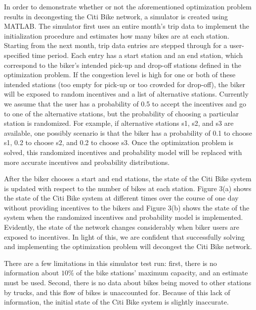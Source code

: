 \documentclass[times, 10pt,twocolumn]{article}
\begin{document}
In order to demonstrate whether or not the aforementioned optimization problem results in decongesting the Citi Bike network, a simulator is created using MATLAB. The simulator first uses an entire month's trip data to implement the initialization procedure and estimates how many bikes are at each station. Starting from the next month, trip data entries are stepped through for a user-specified time period. Each entry has a start station and an end station, which correspond to the biker's intended pick-up and drop-off stations defined in the optimization problem. If the congestion level is high for one or both of these intended stations (too empty for pick-up or too crowded for drop-off), the biker will be exposed to random incentives and a list of alternative stations. Currently we assume that the user has a probability of 0.5 to accept the incentives and go to one of the alternative stations, but the probability of choosing a particular station is randomized. For example, if alternative stations s1, s2, and s3 are available, one possibly scenario is that the biker has a probability of 0.1 to choose s1, 0.2 to choose s2, and 0.2 to choose s3. Once the optimization problem is solved, this randomized incentives and probability model will be replaced with more accurate incentives and probability distributions.

After the biker chooses a start and end stations, the state of the Citi Bike system is updated with respect to the number of bikes at each station. Figure 3(a) shows the state of the Citi Bike system at different times over the course of one day without providing incentives to the bikers and Figure 3(b) shows the state of the system when the randomized incentives and probability model is implemented. Evidently, the state of the network changes considerably when biker users are exposed to incentives. In light of this, we are confident that successfully solving and implementing the optimization problem will decongest the Citi Bike network.

There are a few limitations in this simulator test run: first, there is no information about $10\%$ of the bike stations' maximum capacity, and an estimate must be used. Second, there is no data about bikes being moved to other stations by trucks, and this flow of bikes is unaccounted for. Because of this lack of information, the initial state of the Citi Bike system is slightly inaccurate.

\end{document}
